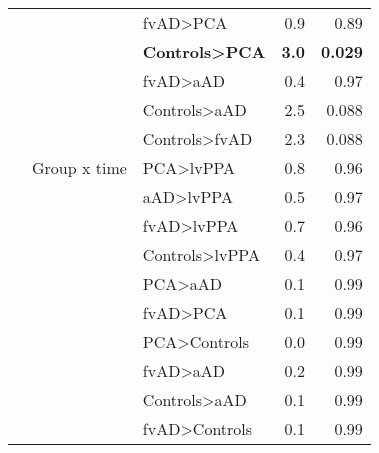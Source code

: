 \documentclass[]{article}
\begin{document}
\begin{table}[ht]
{\begin{tabular}{lllrr}
   &  & fvAD>PCA & 0.9 & 0.89 \\ 
   &  & \textbf{Controls>PCA} & \textbf{3.0} & \textbf{0.029} \\ 
   &  & fvAD>aAD & 0.4 & 0.97 \\ 
   &  & Controls>aAD & 2.5 & 0.088 \\ 
   &  & Controls>fvAD & 2.3 & 0.088 \\ 
   & Group x time & PCA>lvPPA & 0.8 & 0.96 \\ 
   &  & aAD>lvPPA & 0.5 & 0.97 \\ 
   &  & fvAD>lvPPA & 0.7 & 0.96 \\ 
   &  & Controls>lvPPA & 0.4 & 0.97 \\ 
   &  & PCA>aAD & 0.1 & 0.99 \\ 
   &  & fvAD>PCA & 0.1 & 0.99 \\ 
   &  & PCA>Controls & 0.0 & 0.99 \\ 
   &  & fvAD>aAD & 0.2 & 0.99 \\ 
   &  & Controls>aAD & 0.1 & 0.99 \\ 
   &  & fvAD>Controls & 0.1 & 0.99 \\ 
   \hline
\end{tabular}
}
\end{table}
\end{document}
